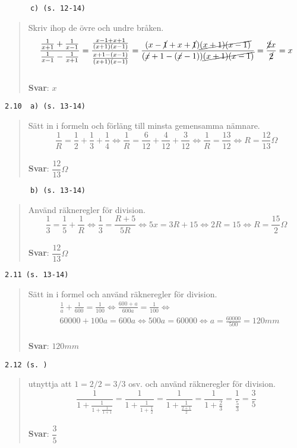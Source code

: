 \documentclass[a4paper]{article}
\newcommand{\tskcol}[1]{\textcolor{tskcol}{#1}}
\begin{document}
	\texttt{\tskcol{~~~~~~c) (s. 12-14)}}
	\begin{quotation}
		\noindent
		Skriv ihop de övre och undre bråken.
		\[\dfrac{\frac{1}{x+1}+\frac{1}{x-1}}{\frac{1}{x-1}-\frac{1}{x+1}}=
		\dfrac{\frac{x-1+x+1}{(x+1)(x-1)}}{\frac{x+1-(x-1)}{(x+1)(x-1)}}=
		\dfrac{(x-\cancel{1}+x+\cancel{1})\cancel{(x+1)(x-1)}}{(\cancel{x}+1-(\cancel{x}-1))\cancel{(x+1)(x-1)}}=
		\dfrac{\cancel{2}x}{\cancel{2}}=
		x\]
		\\
		\textbf{Svar}: $x$
	\end{quotation}
	
	\texttt{\tskcol{2.10~~a) (s. 13-14)}}
	\begin{quotation}
		\noindent
		Sätt in i formeln och förläng till minsta gemensamma nämnare.
		\[\frac{1}{R}=\frac{1}{2}+\frac{1}{3}+\frac{1}{4} \Leftrightarrow
		\frac{1}{R}=\frac{6}{12}+ \frac{4}{12}+\frac{3}{12} \Leftrightarrow
		\frac{1}{R}=\frac{13}{12} \Leftrightarrow
		R=\frac{12}{13}\Omega\]
		\\
		\textbf{Svar}: $\dfrac{12}{13}\Omega$
	\end{quotation}
	
	\texttt{\tskcol{~~~~~~b) (s. 13-14)}}
	\begin{quotation}
		\noindent
		Använd räkneregler för division.
		\[\frac{1}{3}=\frac{1}{5}+\frac{1}{R} \Leftrightarrow
		\frac{1}{3}=\frac{R+5}{5R} \Leftrightarrow
		5x=3R+15 \Leftrightarrow
		2R=15 \Leftrightarrow
		R=\frac{15}{2} \Omega\]
		\\
		\textbf{Svar}: $\dfrac{12}{13}\Omega$
	\end{quotation}
	
	\texttt{\tskcol{2.11 (s. 13-14)}}
	\begin{quotation}
		\noindent
		Sätt in i formel och använd räkneregler för division.
		\begin{align*}
		& \frac{1}{a}+\frac{1}{600}=\frac{1}{100} \Leftrightarrow
		\frac{600+a}{600a}=\frac{1}{100} \Leftrightarrow \\
		& 60000+100a=600a \Leftrightarrow
		500a=60000 \Leftrightarrow
		a=\frac{60000}{500}=120mm
		\end{align*}
		\\
		\textbf{Svar}: $120mm$
	\end{quotation}
	
	\texttt{\tskcol{2.12 (s. )}}
	\begin{quotation}
		\noindent
		utnyttja att $1=2/2=3/3$ osv. och använd räkneregler för division.
		\[\dfrac{1}{1+\frac{1}{1+\frac{1}{1+1}}}=
		\dfrac{1}{1+\frac{1}{1+\frac{1}{2}}}=
		\dfrac{1}{1+\frac{1}{\frac{2+1}{2}}}=
		\dfrac{1}{1+\frac{2}{3}}=
		\dfrac{1}{\frac{5}{3}}=
		\dfrac{3}{5}\]
		\\
		\textbf{Svar}: $\dfrac{3}{5}$
	\end{quotation}
	
\end{document}
